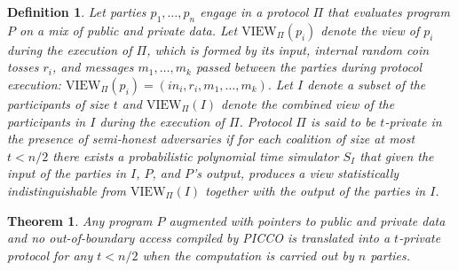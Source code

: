 \documentclass[11pt]{article}
\newtheorem{definition}{Definition}
\newtheorem{theorem}{Theorem}
\begin{document}
\begin{definition}
Let parties $p_1, {\ldots}, p_n$ engage in a protocol $\Pi$ that evaluates
program $P$ on a mix of public and private data. Let
$\mathrm{VIEW}_\Pi(p_i)$ denote the view of $p_i$ during the execution of
$\Pi$, which is formed by its input, internal random coin tosses $r_i$, and
messages $m_1, {\ldots}, m_k$ passed between the parties during protocol
execution: $\mathrm{VIEW}_{\Pi}(p_i) = (in_i, r_i, m_1, {\ldots}, m_k).$ Let
$I$ denote a subset of the participants of size $t$ and
$\mathrm{VIEW}_\Pi(I)$ denote the combined view of the participants in $I$
during the execution of $\Pi$. Protocol $\Pi$ is said to be $t$-private in
the presence of semi-honest adversaries if for each coalition of size at
most $t < n/2$ there exists a probabilistic polynomial time simulator $S_I$
that given the input of the parties in $I$, $P$, and $P$'s output, produces
a view statistically indistinguishable from $\mathrm{VIEW}_\Pi(I)$ together
with the output of the parties in $I$.
\end{definition}

\begin{theorem} \label{thm:security}
Any program $P$ augmented with pointers to public and private data and no
out-of-boundary access compiled by PICCO is translated into a $t$-private
protocol for any $t < n/2$ when the computation is carried out by $n$
parties.
\end{theorem}
\end{document}
